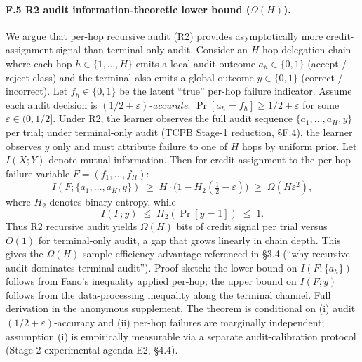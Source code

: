 \paragraph{F.5 R2 audit information-theoretic lower bound ($\Omega(H)$).}
We argue that per-hop recursive audit (R2) provides asymptotically more credit-assignment signal than terminal-only audit. Consider an $H$-hop delegation chain where each hop $h\in\{1,\ldots,H\}$ emits a local audit outcome $a_h\in\{0,1\}$ (accept / reject-class) and the terminal also emits a global outcome $y\in\{0,1\}$ (correct / incorrect). Let $f_h\in\{0,1\}$ be the latent ``true'' per-hop failure indicator. Assume each audit decision is \emph{$(1/2+\varepsilon)$-accurate}: $\Pr[a_h = f_h]\geq 1/2+\varepsilon$ for some $\varepsilon\in(0,1/2]$. Under R2, the learner observes the full audit sequence $\{a_1,\ldots,a_H, y\}$ per trial; under terminal-only audit (TCPB Stage-1 reduction, \S F.4), the learner observes $y$ only and must attribute failure to one of $H$ hops by uniform prior. Let $I(X;Y)$ denote mutual information. Then for credit assignment to the per-hop failure variable $F{=}(f_1,\ldots,f_H)$:
\[
I(F;\{a_1,\ldots,a_H,y\})\;\geq\; H\cdot\big(1 - H_2(\tfrac{1}{2}-\varepsilon)\big)\;\geq\;\Omega(H\varepsilon^2),
\]
where $H_2$ denotes binary entropy, while
\[
I(F;y)\;\leq\;H_2(\Pr[y{=}1])\;\leq\;1.
\]
Thus R2 recursive audit yields $\Omega(H)$ bits of credit signal per trial versus $O(1)$ for terminal-only audit, a gap that grows linearly in chain depth. This gives the $\Omega(H)$ sample-efficiency advantage referenced in \S 3.4 (``why recursive audit dominates terminal audit''). Proof sketch: the lower bound on $I(F;\{a_h\})$ follows from Fano's inequality applied per-hop; the upper bound on $I(F;y)$ follows from the data-processing inequality along the terminal channel. Full derivation in the anonymous supplement. The theorem is conditional on (i) audit $(1/2+\varepsilon)$-accuracy and (ii) per-hop failures are marginally independent; assumption (i) is empirically measurable via a separate audit-calibration protocol (Stage-2 experimental agenda E2, \S 4.4).

